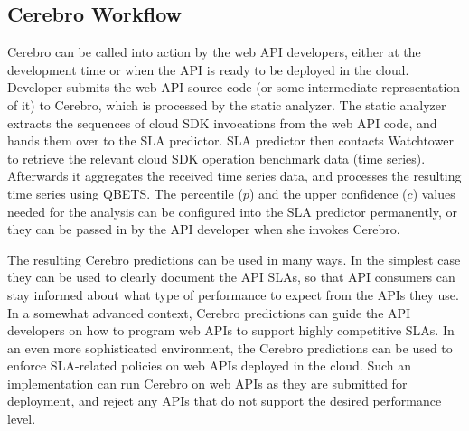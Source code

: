 \subsection{Cerebro Workflow}


Cerebro can be called into action by the web API developers, either at the development time or when the
API is ready to be deployed in the cloud. Developer submits the web API source code (or some intermediate
representation of it) to Cerebro, which is processed by the static analyzer. The static
analyzer extracts the sequences of cloud SDK invocations from the web API code, and hands them over
to the SLA predictor. SLA predictor then contacts Watchtower to retrieve the relevant cloud SDK operation
benchmark data (time series). Afterwards it aggregates the received time series data, and processes
the resulting time series using QBETS. The percentile ($p$) and the upper confidence ($c$) values needed
for the analysis can be configured into the SLA predictor permanently, or they can be passed in by the API
developer when she invokes Cerebro. 

The resulting Cerebro predictions can be used in many ways. In the simplest case they can be
used to clearly document the API SLAs, so that API consumers can stay informed about what 
type of performance to expect from the APIs they use. In a somewhat advanced context, Cerebro
predictions can guide the API developers on how to program web APIs to support highly competitive
SLAs. In an
even more sophisticated environment, the Cerebro predictions can be used to enforce SLA-related
policies on web APIs deployed in the cloud. Such an implementation
can run Cerebro on web APIs as they are submitted for deployment, and reject any APIs that do not
support the desired performance level.
